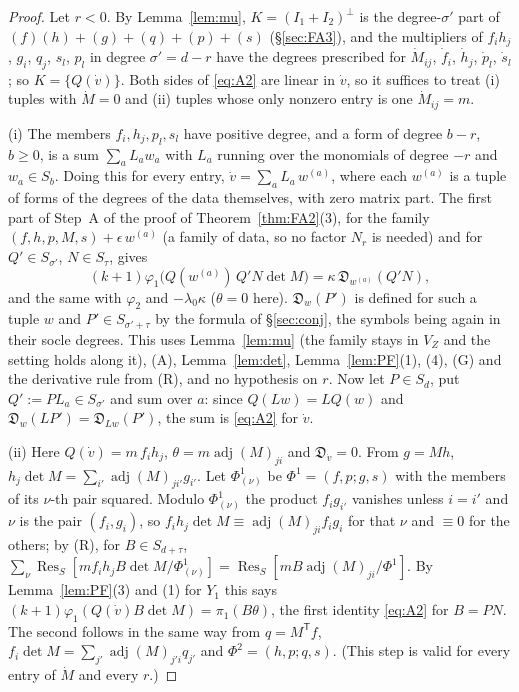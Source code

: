 \documentclass[11pt]{article}
\numberwithin{equation}{section}
\theoremstyle{remark}
\newcommand{\VZ}{V_Z}
\newcommand{\Res}{\operatorname{Res}}
\newcommand{\T}{\mathsf{T}}
\newcommand{\lz}{\lambda_0}
\begin{document}
\begin{proof}
Let $r<0$. By Lemma~\ref{lem:mu}, $K=(I_1+I_2)^\perp$ is the degree-$\sigma'$ part of $(f)(h)+(g)+(q)+(p)+(s)$
(\S\ref{sec:FA3}), and the multipliers of $f_ih_j$, $g_i$, $q_j$, $s_l$, $p_l$ in degree $\sigma'=d-r$ have the
degrees prescribed for $\dot M_{ij}$, $\dot f_i$, $\dot h_j$, $\dot p_l$, $\dot s_l$; so $K=\{Q(\dot v)\}$. Both sides of
\eqref{eq:A2} are linear in $\dot v$, so it suffices to treat (i) tuples with $\dot M=0$ and (ii) tuples whose only
nonzero entry is one $\dot M_{ij}=m$.

(i) The members $f_i,h_j,p_l,s_l$ have positive degree, and a form of degree $b-r$, $b\ge0$, is a sum
$\sum_aL_aw_a$ with $L_a$ running over the monomials of degree $-r$ and $w_a\in S_b$. Doing this for every entry,
$\dot v=\sum_aL_a\,w^{(a)}$, where each $w^{(a)}$ is a tuple of forms of the degrees of the data themselves, with zero
matrix part. The first part of Step~A of the proof of Theorem~\ref{thm:FA2}(3), for the family
$(f,h,p,M,s)+\epsilon\,w^{(a)}$ (a family of data, so no factor $N_r$ is needed) and for $Q'\in S_{\sigma'}$,
$N\in S_\tau$, gives
\[
(k+1)\varphi_1\bigl(Q(w^{(a)})\,Q'N\det M\bigr)=\kappa\,\mathfrak D_{w^{(a)}}(Q'N),
\]
and the same with $\varphi_2$ and $-\lz\kappa$ ($\theta=0$ here). $\mathfrak D_w(P')$ is defined for such a tuple $w$
and $P'\in S_{\sigma'+\tau}$ by the formula of \S\ref{sec:conj}, the symbols being again in their socle degrees.
This uses Lemma~\ref{lem:mu} (the family stays in $\VZ$ and the setting holds along it), (A), Lemma~\ref{lem:det},
Lemma~\ref{lem:PF}(1), (4), (G) and the derivative rule from (R), and no hypothesis on $r$. Now let $P\in S_d$, put
$Q':=PL_a\in S_{\sigma'}$ and sum over $a$: since $Q(Lw)=LQ(w)$ and $\mathfrak D_{w}(LP')=\mathfrak D_{Lw}(P')$, the sum
is \eqref{eq:A2} for $\dot v$.

(ii) Here $Q(\dot v)=m\,f_ih_j$, $\theta=m\operatorname{adj}(M)_{ji}$ and $\mathfrak D_{\dot v}=0$. From
$g=Mh$, $h_j\det M=\sum_{i'}\operatorname{adj}(M)_{ji'}g_{i'}$. Let $\Phi^1_{(\nu)}$ be $\Phi^1=(f,p;g,s)$ with the members
of its $\nu$-th pair squared. Modulo $\Phi^1_{(\nu)}$ the product $f_ig_{i'}$ vanishes unless $i=i'$ and $\nu$ is
the pair $(f_i,g_i)$, so $f_ih_j\det M\equiv\operatorname{adj}(M)_{ji}f_ig_i$ for that $\nu$ and $\equiv0$ for the
others; by (R), for $B\in S_{d+\tau}$,
$\sum_\nu\Res_S[m f_ih_jB\det M/\Phi^1_{(\nu)}]=\Res_S[mB\operatorname{adj}(M)_{ji}/\Phi^1]$. By Lemma~\ref{lem:PF}(3) and
(1) for $Y_1$ this says $(k+1)\varphi_1(Q(\dot v)B\det M)=\pi_1(B\theta)$, the first identity \eqref{eq:A2} for $B=PN$.
The second follows in the same way from $q=M^\T f$, $f_i\det M=\sum_{j'}\operatorname{adj}(M)_{j'i}q_{j'}$ and
$\Phi^2=(h,p;q,s)$. (This step is valid for every entry of $\dot M$ and every $r$.)


\end{proof}
\end{document}
